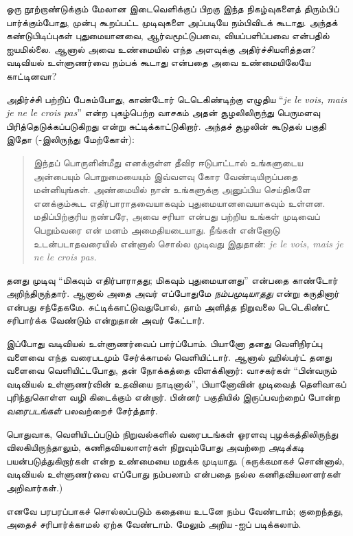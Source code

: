 \documentclass[../../../include/open-logic-section]{subfiles}
\begin{document}


ஒரு நூற்றாண்டுக்கும் மேலான இடைவெளிக்குப் பிறகு இந்த நிகழ்வுகளைத்
திரும்பிப் பார்க்கும்போது, முன்பு கூறப்பட்ட முடிவுகளை அப்படியே
நம்பிவிடக் கூடாது. அந்தக் கண்டுபிடிப்புகள் புதுமையானவை,
ஆர்வமூட்டுபவை, வியப்பளிப்பவை என்பதில் ஐயமில்லை. ஆனால் அவை
உண்மையில் எந்த அளவுக்கு அதிர்ச்சியளித்தன? வடிவியல் உள்ளுணர்வை
நம்பக் கூடாது என்பதை அவை உண்மையிலேயே காட்டினவா?

அதிர்ச்சி பற்றிப் பேசும்போது, காண்டோர் டெடெகிண்டிற்கு எழுதிய
“\emph{je le vois, mais je ne le crois
pas}” என்ற புகழ்பெற்ற வாசகம் அதன் சூழலிலிருந்து பெருமளவு
பிரித்தெடுக்கப்படுகிறது என்று \citet{Gouvea2011} சுட்டிக்காட்டுகிறார்.
அந்தச் சூழலின் கூடுதல் பகுதி இதோ (\citeauthor{Gouvea2011}-இலிருந்து
மேற்கோள்):
\begin{quote}
இந்தப் பொருளின்மீது எனக்குள்ள தீவிர ஈடுபாட்டால் உங்களுடைய
அன்பையும் பொறுமையையும் இவ்வளவு கோர வேண்டியிருப்பதை மன்னியுங்கள்.
அண்மையில் நான் உங்களுக்கு அனுப்பிய செய்திகளே எனக்கும்கூட
எதிர்பாராதவையாகவும் புதுமையானவையாகவும் உள்ளன. மதிப்பிற்குரிய
நண்பரே, அவை சரியா என்பது பற்றிய உங்கள் முடிவைப் பெறும்வரை
என் மனம் அமைதியடையாது. நீங்கள் என்னோடு உடன்படாதவரையில்
என்னால் சொல்ல முடிவது இதுதான்:
\emph{je le vois, mais je ne le crois pas.}
\end{quote}
தனது முடிவு “மிகவும் எதிர்பாராதது; மிகவும் புதுமையானது” என்பதை
காண்டோர் அறிந்திருந்தார். ஆனால் அதை அவர் எப்போதுமே
\emph{நம்பமுடியாதது} என்று கருதினார் என்பது சந்தேகமே.
\citeauthor{Gouvea2011} சுட்டிக்காட்டுவதுபோல், தாம் அளித்த
நிறுவலை டெடெகிண்ட் சரிபார்க்க வேண்டும் என்றுதான் அவர் கேட்டார்.

இப்போது வடிவியல் உள்ளுணர்வைப் பார்ப்போம். பியானோ தனது
வெளிநிரப்பு வளைவை எந்த வரைபடமும் சேர்க்காமல் வெளியிட்டார்.
ஆனால் ஹில்பர்ட் தனது வளைவை வெளியிட்டபோது, தன் நோக்கத்தை
விளக்கினார்: வாசகர்கள் “பின்வரும் வடிவியல் உள்ளுணர்வின்
உதவியை நாடினால்”, பியானோவின் முடிவைத் தெளிவாகப் புரிந்துகொள்ள
வழி கிடைக்கும் என்றார். பின்னர்
 பகுதியில் இருப்பவற்றைப்
போன்ற \emph{வரைபடங்கள்} பலவற்றைச் சேர்த்தார்.

பொதுவாக, வெளியிடப்படும் நிறுவல்களில் வரைபடங்கள் ஓரளவு
புழக்கத்திலிருந்து விலகியிருந்தாலும், கணிதவியலாளர்கள்
நிறுவும்போது அவற்றை \emph{அடிக்கடி} பயன்படுத்துகிறார்கள்
என்ற உண்மையை மறுக்க முடியாது. (சுருக்கமாகச் சொன்னால்,
வடிவியல் உள்ளுணர்வை எப்போது நம்பலாம் என்பதை நல்ல
கணிதவியலாளர்கள் அறிவார்கள்.)

எனவே பரபரப்பாகச் சொல்லப்படும் கதையை உடனே நம்ப வேண்டாம்;
குறைந்தது, அதைச் சரிபார்க்காமல் ஏற்க வேண்டாம்.
மேலும் அறிய \citet{Giaquinto2007}-ஐப் படிக்கலாம்.
\end{document}
